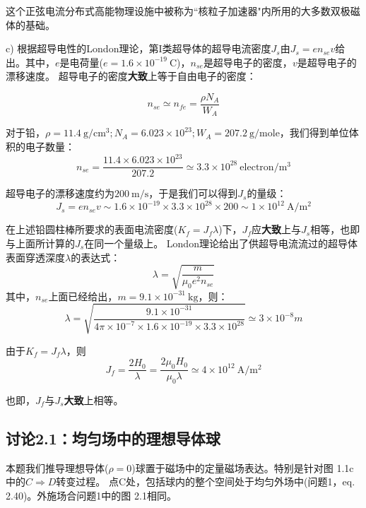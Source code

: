 这个正弦电流分布式高能物理设施中被称为``核粒子加速器"内所用的大多数双极磁体的基础。


c) 根据超导电性的London理论，第I类超导体的超导电流密度$J_s$由$J_s=en_{se}v$给出。其中，$e$是电荷量($e=1.6\times 10^{-19}\ \mathrm{C}$)，$n_{se}$是超导电子的密度，$v$是超导电子的漂移速度。
超导电子的密度\textbf{大致}上等于自由电子的密度：

\begin{equation*}
n_{se}\simeq n_{fe}=\frac{\rho N_A}{W_A} \tag{1.2}
\end{equation*}

对于铅，$\rho=11.4\ \mathrm{g/cm^3};N_A=6.023\times 10^{23};W_A=207.2\ \mathrm{g/mole}$，我们得到单位体积的电子数量：
\begin{equation*}
n_{se}=\frac{11.4\times 6.023\times 10^{23}}{207.2} \simeq 3.3\times 10^{28}\ \mathrm{electron/m^3} \tag{S2.7}
\end{equation*}

超导电子的漂移速度约为$200\ \mathrm{m/s}$，于是我们可以得到$J_s$的量级：
$$
J_s=e n_{se} v\sim 1.6\times 10^{-19} \times 3.3\times 10^{28} \times 200 \sim 1\times 10^{12}\ \mathrm{A/m^2} 
$$

在上述铅圆柱棒所要求的表面电流密度($K_f=J_f \lambda$)下，$J_f$应\textbf{大致}上与$J_s$相等，也即与上面所计算的$J_s$在同一个量级上。
London理论给出了供超导电流流过的超导体表面穿透深度$\lambda$的表达式：
\begin{equation*}
\lambda=\sqrt{\frac{m}{\mu_0 e^2 n_{se}}} \tag{1.1}
\end{equation*}
其中，$n_{se}$上面已经给出，$m=9.1\times 10^{-31}\ \mathrm{kg}$，则：
$$
\lambda=\sqrt{\frac{9.1\times 10^{-31}}{4\pi \times 10^{-7}\times 1.6\times 10^{-19}\times 3.3\times 10^{28}}}\simeq 3\times 10^{-8} m
$$

由于$K_f=J_f\lambda$，则
\begin{equation*}
J_f=\frac{2H_0}{\lambda}=\frac{2\mu_0 H_0}{\mu_0 \lambda}\simeq 4\times 10^{12} \ \mathrm{A/m^2}  \tag{S2.9}
\end{equation*}

也即，$J_f$与$J_s$\textbf{大致}上相等。



\subsection{讨论2.1：均匀场中的理想导体球}
本题我们推导理想导体($\rho=0$)球置于磁场中的定量磁场表达。特别是针对图 1.1c中的$C\Rightarrow D$转变过程。
点C处，包括球内的整个空间处于均匀外场中(问题1，eq. 2.40)。外施场合问题1中的图 2.1相同。

